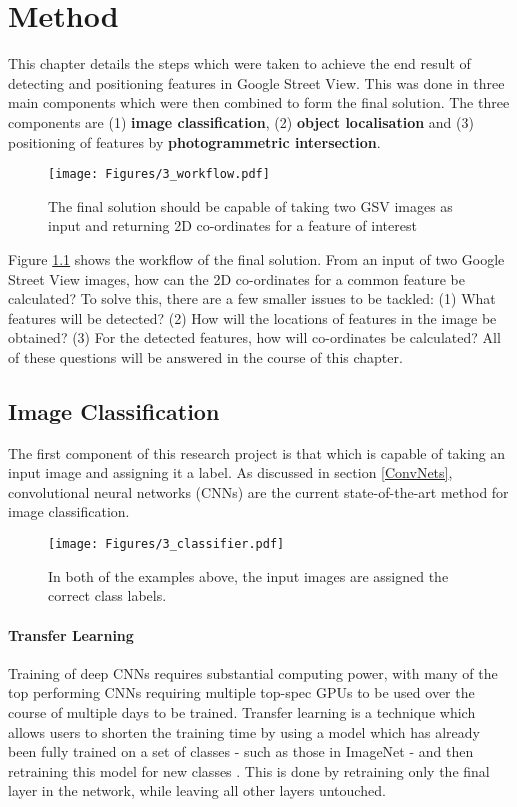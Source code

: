 \chapter{Method}
\label{method}
This chapter details the steps which were taken to achieve the end result of detecting and positioning features in Google Street View. This was done in three main components which were then combined to form the final solution. The three components are (1) \textbf{image classification}, (2) \textbf{object localisation} and (3) positioning of features by \textbf{photogrammetric intersection}.

\begin{figure}[H]
\centering
\texttt{[image: Figures/3\_workflow.pdf]}
\decoRule
\caption[Work flow]{The final solution should be capable of taking two GSV images as input and returning 2D co-ordinates for a feature of interest}
\label{fig:method_workflow}
\end{figure}

Figure \ref{fig:method_workflow} shows the workflow of the final solution. From an input of two Google Street View images, how can the 2D co-ordinates for a common feature be calculated? To solve this, there are a few smaller issues to be tackled: (1) What features will be detected? (2) How will the locations of features in the image be obtained? (3) For the detected features, how will co-ordinates be calculated? All of these questions will be answered in the course of this chapter.

\section{Image Classification}
The first component of this research project is that which is capable of taking an input image and assigning it a label. As discussed in section \ref{ConvNets}, convolutional neural networks (CNNs) are the current state-of-the-art method for image classification.

\begin{figure}[H]
\centering
\texttt{[image: Figures/3\_classifier.pdf]}
\decoRule
\caption[Image Classification]{In both of the examples above, the input images are assigned the correct class labels.}
\label{fig:classifier}
\end{figure}

\subsubsection*{Transfer Learning}
Training of deep CNNs requires substantial computing power, with many of the top performing CNNs requiring multiple top-spec GPUs to be used over the course of multiple days to be trained. Transfer learning is a technique which allows users to shorten the training time by using a model which has already been fully trained on a set of classes - such as those in ImageNet - and then retraining this model for new classes \parencite{transfer_learning}. This is done by retraining only the final layer in the network, while leaving all other layers untouched.

